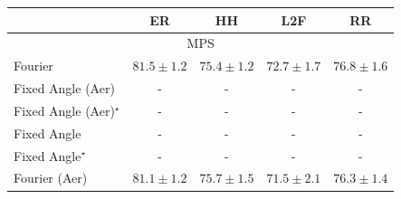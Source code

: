 \begin{tabular}{l|cccc|}
\toprule
            & ER & HH & L2F & RR \\
\midrule
\multicolumn{5}{c}{\rule{0pt}{8pt}MPS} \\
\midrule
Fourier & {\cellcolor[HTML]{782A05}} \color[HTML]{F1F1F1} $81.5\pm 1.2$ & {\cellcolor[HTML]{FEBB47}} \color[HTML]{000000} $75.4\pm 1.2$ & {\cellcolor[HTML]{FFF3B2}} \color[HTML]{000000} $72.7\pm 1.7$ & {\cellcolor[HTML]{FA9125}} \color[HTML]{F1F1F1} $76.8\pm 1.6$ \\
Fixed Angle (Aer) & {\cellcolor[HTML]{000000}} \color[HTML]{F1F1F1} {\cellcolor{white}} \color{black} - & {\cellcolor[HTML]{000000}} \color[HTML]{F1F1F1} {\cellcolor{white}} \color{black} - & {\cellcolor[HTML]{000000}} \color[HTML]{F1F1F1} {\cellcolor{white}} \color{black} - & {\cellcolor[HTML]{000000}} \color[HTML]{F1F1F1} {\cellcolor{white}} \color{black} - \\
Fixed Angle (Aer)$^\star$ & {\cellcolor[HTML]{000000}} \color[HTML]{F1F1F1} {\cellcolor{white}} \color{black} - & {\cellcolor[HTML]{000000}} \color[HTML]{F1F1F1} {\cellcolor{white}} \color{black} - & {\cellcolor[HTML]{000000}} \color[HTML]{F1F1F1} {\cellcolor{white}} \color{black} - & {\cellcolor[HTML]{000000}} \color[HTML]{F1F1F1} {\cellcolor{white}} \color{black} - \\
Fixed Angle & {\cellcolor[HTML]{000000}} \color[HTML]{F1F1F1} {\cellcolor{white}} \color{black} - & {\cellcolor[HTML]{000000}} \color[HTML]{F1F1F1} {\cellcolor{white}} \color{black} - & {\cellcolor[HTML]{000000}} \color[HTML]{F1F1F1} {\cellcolor{white}} \color{black} - & {\cellcolor[HTML]{000000}} \color[HTML]{F1F1F1} {\cellcolor{white}} \color{black} - \\
Fixed Angle$^\star$ & {\cellcolor[HTML]{000000}} \color[HTML]{F1F1F1} {\cellcolor{white}} \color{black} - & {\cellcolor[HTML]{000000}} \color[HTML]{F1F1F1} {\cellcolor{white}} \color{black} - & {\cellcolor[HTML]{000000}} \color[HTML]{F1F1F1} {\cellcolor{white}} \color{black} - & {\cellcolor[HTML]{000000}} \color[HTML]{F1F1F1} {\cellcolor{white}} \color{black} - \\
Fourier (Aer) & {\cellcolor[HTML]{862E05}} \color[HTML]{F1F1F1} $81.1\pm 1.2$ & {\cellcolor[HTML]{FEB23F}} \color[HTML]{000000} $75.7\pm 1.5$ & {\cellcolor[HTML]{FFFCD7}} \color[HTML]{000000} $71.5\pm 2.1$ & {\cellcolor[HTML]{FE9F2E}} \color[HTML]{000000} $76.3\pm 1.4$ \\

\end{tabular}
